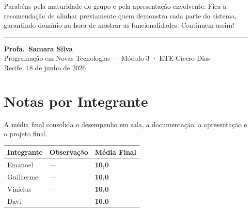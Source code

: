 \documentclass[
  sigconf,
  nonacm,
  language=portuguese
]{acmart}
\begin{document}
Parabéns pela maturidade do grupo e pela apresentação envolvente. Fica a recomendação de alinhar previamente quem demonstra cada parte do sistema, garantindo domínio na hora de mostrar as funcionalidades. Continuem assim!

\vspace{1.5em}
\noindent\rule{\linewidth}{0.4pt}

\begin{flushright}
\textbf{Profa.\ Samara Silva}\\
{\small\color{cmuted} Programação em Novas Tecnologias --- Módulo 3 · ETE Cícero Dias}\\
{\small\color{cmuted} Recife, 18 de junho de 2026}
\end{flushright}

\appendix
\onecolumn
\section{Notas por Integrante}

A média final consolida o desempenho em sala, a documentação, a apresentação e o projeto final.

\vspace{0.5em}
\begin{tabularx}{\linewidth}{@{} X p{3cm} p{2.5cm} @{}}
\toprule
\textbf{Integrante} & \textbf{Observação} & \textbf{Média Final} \\
\midrule
Emanoel & --- & \textbf{10,0} \\
Guilherme & --- & \textbf{10,0} \\
Vinícius & --- & \textbf{10,0} \\
Davi & --- & \textbf{10,0} \\
\bottomrule
\end{tabularx}
\end{document}
